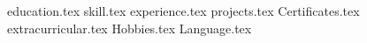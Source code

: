 \documentclass[9pt, a4paper]{awesome-cv}
\newcommand*{\sectiondir}{resume/}
\begin{document}
\makecvheader
{education.tex}
{skill.tex}
{experience.tex}
{projects.tex}
{Certificates.tex}
{extracurricular.tex}
{Hobbies.tex}
{Language.tex}

\end{document}
